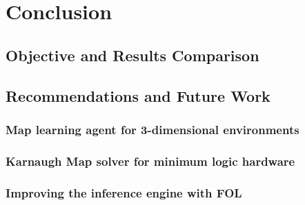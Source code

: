 \chapter{Conclusion} 
\label{Conclusion}










\section{Objective and Results Comparison}

\section{Recommendations and Future Work}


\subsection{Map learning agent for 3-dimensional environments}
\subsection{Karnaugh Map solver for minimum logic hardware}
\subsection{Improving the inference engine with FOL}